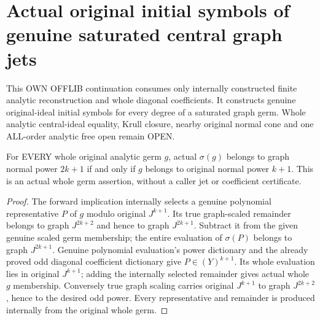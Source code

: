 \section{Actual original initial symbols of genuine saturated central graph jets}
This OWN OFFLIB continuation consumes only internally constructed finite analytic reconstruction and whole diagonal coefficients. It constructs genuine original-ideal initial symbols for every degree of a saturated graph germ. Whole analytic central-ideal equality, Krull closure, nearby original normal cone and one ALL-order analytic free open remain OPEN.

\begin{lemma}
\label{hir:relative-normal-graph-central-whole-scaling-power-reflection}
\leanok
For EVERY whole original analytic germ $g$, actual $\sigma(g)$ belongs to graph normal power $2k+1$ if and only if $g$ belongs to original normal power $k+1$. This is an actual whole germ assertion, without a caller jet or coefficient certificate.
\end{lemma}
\begin{proof}
The forward implication internally selects a genuine polynomial representative $P$ of $g$ modulo original $J^{k+1}$. Its true graph-scaled remainder belongs to graph $J^{2k+2}$ and hence to graph $J^{2k+1}$. Subtract it from the given genuine scaled germ membership; the entire evaluation of $\sigma(P)$ belongs to graph $J^{2k+1}$. Genuine polynomial evaluation's power dictionary and the already proved odd diagonal coefficient dictionary give $P\in (Y)^{k+1}$. Its whole evaluation lies in original $J^{k+1}$; adding the internally selected remainder gives actual whole $g$ membership. Conversely true graph scaling carries original $J^{k+1}$ to graph $J^{2k+2}$, hence to the desired odd power. Every representative and remainder is produced internally from the original whole germ.
\end{proof}

